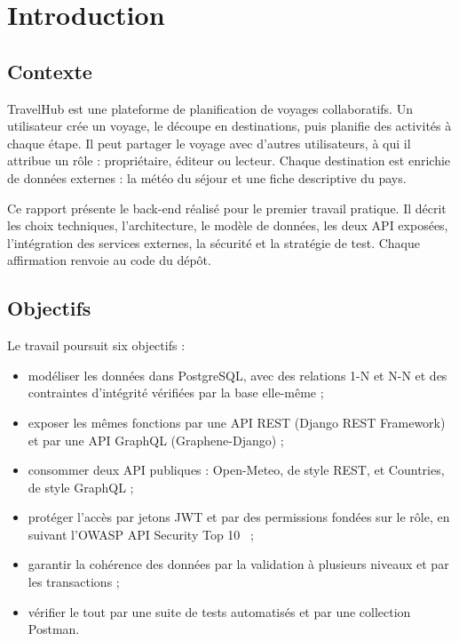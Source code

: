 \section{Introduction}
\label{sec:introduction}

\subsection{Contexte}

TravelHub est une plateforme de planification de voyages collaboratifs. Un utilisateur crée un voyage, le découpe en destinations, puis planifie des activités à chaque étape. Il peut partager le voyage avec d'autres utilisateurs, à qui il attribue un rôle : propriétaire, éditeur ou lecteur. Chaque destination est enrichie de données externes : la météo du séjour et une fiche descriptive du pays.

Ce rapport présente le back-end réalisé pour le premier travail pratique. Il décrit les choix techniques, l'architecture, le modèle de données, les deux API exposées, l'intégration des services externes, la sécurité et la stratégie de test. Chaque affirmation renvoie au code du dépôt.

\subsection{Objectifs}

Le travail poursuit six objectifs :
\begin{itemize}
  \item modéliser les données dans PostgreSQL, avec des relations 1-N et N-N et des contraintes d'intégrité vérifiées par la base elle-même ;
  \item exposer les mêmes fonctions par une API REST (Django REST Framework) et par une API GraphQL (Graphene-Django) ;
  \item consommer deux API publiques : Open-Meteo, de style REST, et Countries, de style GraphQL ;
  \item protéger l'accès par jetons JWT et par des permissions fondées sur le rôle, en suivant l'OWASP API Security Top 10~\cite{owasp} ;
  \item garantir la cohérence des données par la validation à plusieurs niveaux et par les transactions ;
  \item vérifier le tout par une suite de tests automatisés et par une collection Postman.
\end{itemize}

